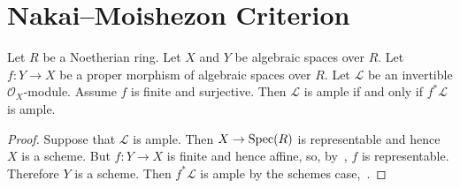 \section{Nakai--Moishezon Criterion}

\begin{lemma}
\label{lemma-surjective-finite-morphism-ample}
Let $R$ be a Noetherian ring.
Let $X$ and $Y$ be algebraic spaces over $R$.
Let $f : Y \to X$ be a proper morphism of algebraic spaces over $R$.
Let $\mathcal{L}$ be an invertible $\mathcal{O}_X$-module.
Assume $f$ is finite and surjective.
Then $\mathcal{L}$ is ample if and only if $f^*\mathcal{L}$ is ample.
\end{lemma}

\begin{proof}
Suppose that $\mathcal{L}$ is ample.
Then $X \to \mathop{\rm Spec}(R)$ is representable and hence $X$ is a scheme.
But $f : Y \to X$ is finite and hence affine, so,
by~, $f$ is representable.
Therefore $Y$ is a scheme.
Then $f^*\mathcal{L}$ is ample by the schemes case,~.


\end{proof}
